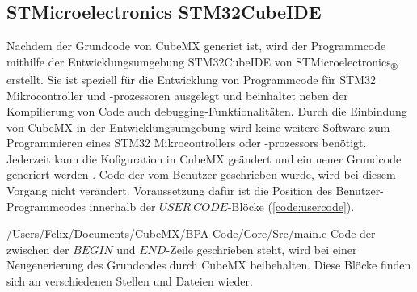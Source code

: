 
\subsection{STMicroelectronics STM32CubeIDE}
Nachdem der Grundcode von CubeMX generiet ist, wird der Programmcode mithilfe der Entwicklungsumgebung STM32CubeIDE von STMicroelectronics\textsubscript{®} erstellt. Sie ist speziell für die Entwicklung von Programmcode für STM32 Mikrocontroller und -prozessoren ausgelegt und beinhaltet neben der Kompilierung von Code auch debugging-Funktionalitäten. Durch die Einbindung von CubeMX in der Entwicklungsumgebung wird keine weitere Software zum Programmieren eines STM32 Mikrocontrollers oder -prozessors benötigt. Jederzeit kann die Kofiguration in CubeMX geändert und ein neuer Grundcode generiert werden \cite{CubeIDE}. Code der vom Benutzer geschrieben wurde, wird bei diesem Vorgang nicht verändert. Voraussetzung dafür ist die Position des Benutzer-Programmcodes innerhalb der $USER\ CODE$-Blöcke (\ref{code:usercode}).

{/Users/Felix/Documents/CubeMX/BPA-Code/Core/Src/main.c}
Code der zwischen der $BEGIN$ und $END$-Zeile geschrieben steht, wird bei einer Neugenerierung des Grundcodes durch CubeMX beibehalten. Diese Blöcke finden sich an verschiedenen Stellen und Dateien wieder.\\

